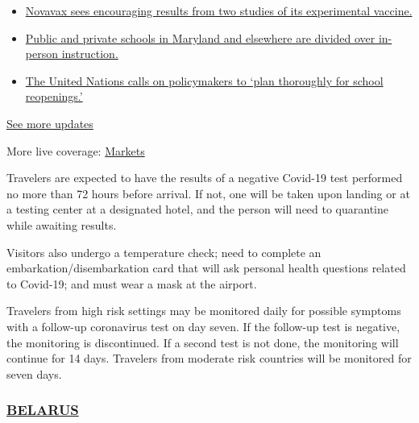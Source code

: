 \begin{itemize}
\tightlist
\item
  \href{https://www.nytimes3xbfgragh.onion/2020/08/04/world/coronavirus-cases.html?action=click\&pgtype=Article\&state=default\&region=MAIN_CONTENT_1\&context=storylines_live_updates\#link-1228a480}{Novavax
  sees encouraging results from two studies of its experimental
  vaccine.}
\item
  \href{https://www.nytimes3xbfgragh.onion/2020/08/04/world/coronavirus-cases.html?action=click\&pgtype=Article\&state=default\&region=MAIN_CONTENT_1\&context=storylines_live_updates\#link-4825b93}{Public
  and private schools in Maryland and elsewhere are divided over
  in-person instruction.}
\item
  \href{https://www.nytimes3xbfgragh.onion/2020/08/04/world/coronavirus-cases.html?action=click\&pgtype=Article\&state=default\&region=MAIN_CONTENT_1\&context=storylines_live_updates\#link-50f7386d}{The
  United Nations calls on policymakers to `plan thoroughly for school
  reopenings.'}
\end{itemize}

\href{https://www.nytimes3xbfgragh.onion/2020/08/04/world/coronavirus-cases.html?action=click\&pgtype=Article\&state=default\&region=MAIN_CONTENT_1\&context=storylines_live_updates}{See
more updates}

More live coverage:
\href{https://www.nytimes3xbfgragh.onion/live/2020/08/04/business/stock-market-today-coronavirus?action=click\&pgtype=Article\&state=default\&region=MAIN_CONTENT_1\&context=storylines_live_updates}{Markets}

Travelers are expected to have the results of a negative Covid-19 test
performed no more than 72 hours before arrival. If not, one will be
taken upon landing or at a testing center at a designated hotel, and the
person will need to quarantine while awaiting results.

Visitors also undergo a temperature check; need to complete an
embarkation/disembarkation card that will ask personal health questions
related to Covid-19; and must wear a mask at the airport.

Travelers from high risk settings may be monitored daily for possible
symptoms with a follow-up coronavirus test on day seven. If the
follow-up test is negative, the monitoring is discontinued. If a second
test is not done, the monitoring will continue for 14 days. Travelers
from moderate risk countries will be monitored for seven days.

\hypertarget{belarus}{%
\subsubsection{\texorpdfstring{\href{https://by.usembassy.gov/u-s-citizen-services/covid-19-information/}{BELARUS}}{BELARUS}}\label{belarus}}

